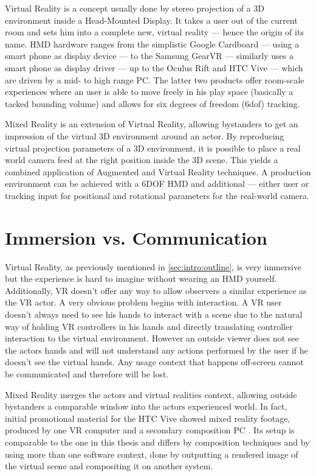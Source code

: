 Virtual Reality is a concept usually done by stereo projection of a 3D 
environment inside a Head-Mounted Display. It takes a user out of the current 
room and sets him into a complete new, virtual reality --- hence the origin of 
its name. HMD hardware ranges from the simplistic Google Cardboard --- using a 
smart phone as display device --- to the Samsung GearVR --- similarly uses a 
smart phone as display driver --- up to the Oculus Rift and HTC Vive --- which 
are driven by a mid- to high range PC. The latter two products offer room-scale 
experiences where an user is able to move freely in his play space (basically a 
tacked bounding volume) and allows for six degrees of freedom (\gls{6dof}) 
tracking.

Mixed Reality is an extension of Virtual Reality, allowing bystanders to get an 
impression of the virtual 3D environment around an actor. By reproducing 
virtual projection parameters of a 3D environment, it is possible to place a 
real world camera feed at the right position inside the 3D scene. This 
yields a combined application of Augmented and Virtual Reality techniques. A 
production environment can be achieved with a \gls{6DOF} HMD and additional --- 
either user or tracking input for positional and rotational parameters for the 
real-world camera. 

\section{Immersion vs. Communication}

Virtual Reality, as previously mentioned in \ref{sec:intro:outline}, is very 
immersive but the experience is hard to imagine without wearing an HMD 
yourself. Additionally, VR doesn't offer any way to allow observers a similar 
experience as the VR actor.
\newline
A very obvious problem begins with interaction. A VR user doesn't always need 
to see his hands to interact with a scene due to the natural way of holding VR 
controllers in his hands and directly translating controller interaction to the
virtual environment. However an outside viewer does not see the actors hands 
and will not understand any actions performed by the user if he doesn't see the 
virtual hands. Any usage context that happens off-screen cannot be communicated 
and therefore will be lost.

Mixed Reality merges the actors and virtual realities context, allowing outside 
bystanders a comparable window into the actors experienced world. In fact, 
initial promotional material for the HTC Vive showed mixed reality footage, 
produced by one VR computer and a secondary composition PC 
\cite{valve:mr-production:2016}. Its setup is comparable to the one in this 
thesis and differs by composition techniques and by using more than one 
software context, done by outputting a rendered image of the virtual scene and 
compositing it on another system.

